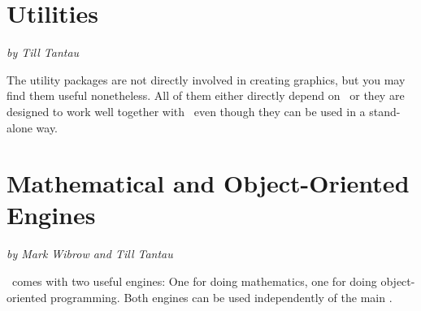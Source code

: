 \part{Utilities}
\label{part-utilities}

{\Large \emph{by Till Tantau}}


\bigskip
\noindent
The utility packages are not directly involved in creating graphics,
but you may find them useful nonetheless. All of them either directly
depend on \pgfname\ or they are designed to work well together with
\pgfname\ even though they can be used in a stand-alone way.

\vskip2cm
\medskip
\noindent
\begin{codeexample}[graphic=white]
\end{codeexample}









\part{Mathematical and Object-Oriented Engines}

{\Large \emph{by Mark Wibrow and Till Tantau}}


\bigskip
\noindent
\pgfname\ comes with two useful engines: One for doing mathematics,
one for doing object-oriented programming. Both engines can be used
independently of the main \pgfname.

